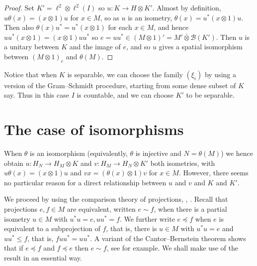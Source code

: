 \documentclass[a4paper,11pt]{article}
\theoremstyle{plain}
\theoremstyle{remark}
\newcommand{\mc}[1]{\mathcal{#1}}
\newcommand{\vnten}{\bar\otimes}
\begin{document}
\begin{proof}
Set $K' = \ell^2 \otimes \ell^2(I)$ so $u\colon K \to H\otimes K'$.  Almost by definition, $u\theta(x) = (x\otimes 1)u$ for $x\in M$, so as $u$ is an isometry, $\theta(x) = u^*(x\otimes 1)u$.  Then also $\theta(x)u^* = u^*(x\otimes 1)$ for each $x\in M$, and hence $uu^* (x\otimes 1) = (x\otimes 1) uu^*$ so $e = uu^* \in (M\otimes 1)' = M' \vnten \mc B(K')$.  Then $u$ is a unitary between $K$ and the image of $e$, and so $u$ gives a spatial isomorphism between $(M\otimes 1)_e$ and $\theta(M)$.
\end{proof}

Notice that when $K$ is separable, we can choose the family $(\xi_i)$ by using a version of the Gram--Schmidt procedure, starting from some dense subset of $K$ say.  Thus in this case $I$ is countable, and we can choose $K'$ to be separable.


\section{The case of isomorphisms}

When $\theta$ is an isomorphism (equivalently, $\theta$ is injective and $N = \theta(M)$) we hence obtain $u\colon H_N \to H_M \otimes K$ and $v\colon H_M \to H_N\otimes K'$ both isometries, with $u\theta(x)=(x\otimes 1)u$ and $vx=(\theta(x)\otimes 1)v$ for $x\in M$.  However, there seems no particular reason for a direct relationship between $u$ and $v$ and $K$ and $K'$.

We proceed by using the comparison theory of projections, \cite[Section~V.1]{TakesakiI}, \cite[Chapter~6]{KadisonRingroseII}.  Recall that projections $e,f\in M$ are equivalent, written $e\sim f$, when there is a partial isometry $u\in M$ with $u^*u=e, uu^*=f$.  We further write $e \preceq f$ when $e$ is equivalent to a subprojection of $f$, that is, there is $u\in M$ with $u^*u=e$ and $uu^* \leq f$, that is, $f uu^* = uu^*$.  A variant of the Cantor--Bernstein theorem shows that if $e \preceq f$ and $f \preceq e$ then $e\sim f$, see \cite[Proposition~V.1.3]{TakesakiI} for example.  We shall make use of the result in an essential way.
\end{document}
